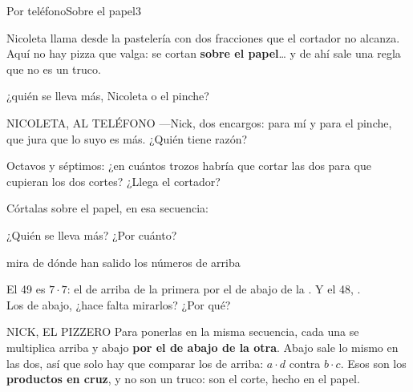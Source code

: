 \documentclass[11pt]{article}
\begin{document}
\begin{ficha}{Por teléfono}{Sobre el papel}{3}

\begin{encargo}
Nicoleta llama desde la pastelería con dos fracciones que el cortador no
alcanza. Aquí no hay pizza que valga: se cortan \textbf{sobre el papel}… y de
ahí sale una regla que no es un truco.
\end{encargo}

\quad
{\footnotesize ¿quién se lleva más, Nicoleta o el pinche?}

\vspace{1.5mm}
{\small
\begin{voz}[nicoleta]{NICOLETA, AL TELÉFONO}
—Nick, dos encargos:  para mí y  para el pinche, que jura
que lo suyo es más. ¿Quién tiene razón?
\end{voz}

\vspace{2mm}
Octavos y séptimos: ¿en cuántos trozos habría que cortar las dos para
que cupieran los dos cortes? \hueco[1.2cm]\quad ¿Llega el cortador? \hueco[1.2cm]

\vspace{2mm}
Córtalas sobre el papel, en esa secuencia:\qquad
{}\qquad{}

\vspace{1mm}
¿Quién se lleva más? \hueco[2.4cm]\quad ¿Por cuánto? \hueco[1.8cm]}

\quad
{\footnotesize mira de dónde han salido los números de arriba}

\vspace{1.5mm}
{\small
\begin{minipage}[c]{.5\linewidth}
\end{minipage}%
\begin{minipage}[c]{.5\linewidth}
El 49 es $7\cdot 7$: el de arriba de la primera por el de abajo de la
\hueco[1.5cm]. Y el 48, \hueco[2.6cm].\\[1.5mm]
Los de abajo, ¿hace falta mirarlos? ¿Por qué? \hueco[2cm]
\end{minipage}}

\vspace{1mm}
\begin{voz}[nick]{NICK, EL PIZZERO}
Para ponerlas en la misma secuencia, cada una se multiplica arriba y abajo
\textbf{por el de abajo de la otra}. Abajo sale lo mismo en las dos, así que
solo hay que comparar los de arriba: $a\cdot d$ contra $b\cdot c$. Esos son los
\textbf{productos en cruz}, y no son un truco: son el corte, hecho en el papel.
\end{voz}


\end{ficha}
\end{document}
